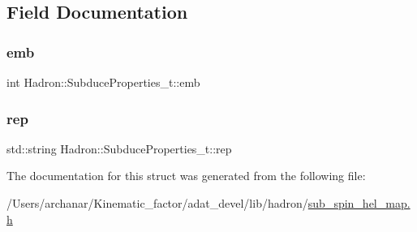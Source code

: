 \subsection{Field Documentation}
\mbox{\label{structHadron_1_1SubduceProperties__t_a3204da77d97084fac69eff126dcf6663}} 
\subsubsection{\texorpdfstring{emb}{emb}}
{\footnotesize\ttfamily int Hadron\+::\+Subduce\+Properties\+\_\+t\+::emb}

\mbox{\label{structHadron_1_1SubduceProperties__t_a0983c7ff2504c5d4a32467371090f08d}} 
\subsubsection{\texorpdfstring{rep}{rep}}
{\footnotesize\ttfamily std\+::string Hadron\+::\+Subduce\+Properties\+\_\+t\+::rep}



The documentation for this struct was generated from the following file\+:\begin{DoxyCompactItemize}
\item 
/\+Users/archanar/\+Kinematic\+\_\+factor/adat\+\_\+devel/lib/hadron/\mbox{\hyperlink{lib_2hadron_2sub__spin__hel__map_8h}{sub\+\_\+spin\+\_\+hel\+\_\+map.\+h}}\end{DoxyCompactItemize}
